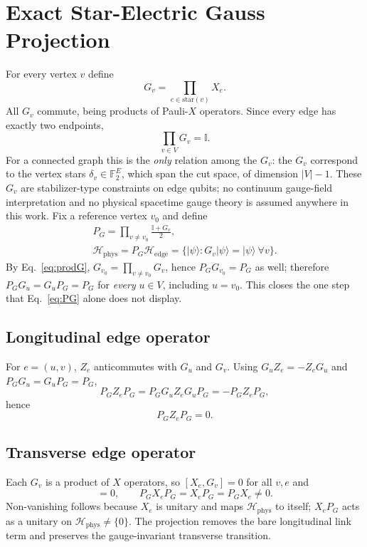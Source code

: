\documentclass[10pt,twocolumn]{article}
\theoremstyle{definition}
\newcommand{\F}{\mathbb{F}_2}
\newcommand{\Hphys}{\mathcal{H}_{\mathrm{phys}}}
\newcommand{\Hedge}{\mathcal{H}_{\mathrm{edge}}}
\newcommand{\PG}{P_G}
\begin{document}
\section{Exact Star-Electric Gauss Projection}
For every vertex $v$ define
\begin{equation}
G_v=\prod_{e\in\mathrm{star}(v)}X_e. \label{eq:Gv}
\end{equation}
All $G_v$ commute, being products of Pauli-$X$ operators. Since every edge has exactly two endpoints,
\begin{equation}
\prod_{v\in V}G_v=\mathbb I. \label{eq:prodG}
\end{equation}
For a connected graph this is the \emph{only} relation among the $G_v$: the $G_v$ correspond to the vertex stars $\delta_v\in\F^{E}$, which span the cut space, of dimension $|V|-1$. These $G_v$ are stabilizer-type constraints on edge qubits; no continuum gauge-field interpretation and no physical spacetime gauge theory is assumed anywhere in this work. Fix a reference vertex $v_0$ and define
\begin{equation}
\begin{gathered}\PG=\prod_{v\neq v_0}\frac{\mathbb I+G_v}{2},\\ \Hphys=\PG\Hedge=\{|\psi\rangle:G_v|\psi\rangle=|\psi\rangle\ \forall v\}.\end{gathered} \label{eq:PG}
\end{equation}
By Eq.~\eqref{eq:prodG}, $G_{v_0}=\prod_{v\ne v_0}G_v$, hence $\PG G_{v_0}=\PG$ as well; therefore $\PG G_u=G_u\PG=\PG$ for \emph{every} $u\in V$, including $u=v_0$. This closes the one step that Eq.~\eqref{eq:PG} alone does not display.

\subsection{Longitudinal edge operator}
For $e=(u,v)$, $Z_e$ anticommutes with $G_u$ and $G_v$. Using $G_uZ_e=-Z_eG_u$ and $\PG G_u=G_u\PG=\PG$,
\[
\PG Z_e\PG=\PG G_uZ_eG_u\PG=-\PG Z_e\PG,
\]
hence
\begin{equation}
\PG Z_e\PG=0. \label{eq:PZP}
\end{equation}

\subsection{Transverse edge operator}
Each $G_v$ is a product of $X$ operators, so $[X_e,G_v]=0$ for all $v,e$ and
\begin{equation}
[X_e,\PG]=0,\qquad \PG X_e\PG=X_e\PG=\PG X_e\neq0. \label{eq:PXP}
\end{equation}
Non-vanishing follows because $X_e$ is unitary and maps $\Hphys$ to itself; $X_e\PG$ acts as a unitary on $\Hphys\neq\{0\}$. The projection removes the bare longitudinal link term and preserves the gauge-invariant transverse transition.
\end{document}
